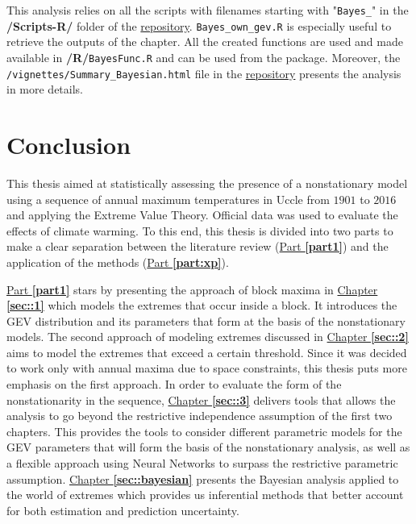 \documentclass[11pt,a4paper,openany, twosided]{book}
\begin{document}
This analysis relies on all the scripts with filenames starting with "\texttt{Bayes\_}" in the \textbf{/Scripts-R/} folder of the \href{https://github.com/proto4426/PissoortThesis/}{repository}. \texttt{Bayes\_own\_gev.R} is especially useful to retrieve the outputs of the chapter.  All the created functions are used and made available in \textbf{/R/}\texttt{BayesFunc.R} and can be used from the package. Moreover,
the \texttt{/vignettes/Summary\_Bayesian.html} file in the \href{https://github.com/proto4426/PissoortThesis/}{repository} presents the analysis in more details.

\newpage





\chapter*{Conclusion}
\thispagestyle{empty}

This thesis aimed at statistically assessing the presence of a nonstationary model using a sequence of annual maximum temperatures in Uccle from $1901$ to $2016$  and applying the Extreme Value Theory. Official data was used to evaluate the effects of climate warming.
To this end, this thesis is divided into two parts to make a clear separation between the literature review (\hyperref[part1]{Part \textbf{\ref{part1}}}) and the application of the methods (\hyperref[part:xp]{Part \textbf{\ref{part:xp}}}).

\hyperref[part1]{Part \textbf{\ref{part1}}} stars by presenting the approach of block maxima in \hyperref[sec::1]{Chapter \textbf{\ref{sec::1}}} which models the extremes that occur inside a block. It introduces the GEV distribution and its parameters that form at the basis of the nonstationary models.
The second approach of modeling extremes discussed in \hyperref[sec::2]{Chapter \textbf{\ref{sec::2}}} aims to model the extremes that exceed a certain threshold.
Since it was decided to work only with annual maxima due to space constraints, this thesis puts more emphasis on the first approach. In order to evaluate the form of the nonstationarity in the sequence,
\hyperref[sec::3]{Chapter \textbf{\ref{sec::3}}} delivers tools that allows the analysis to go beyond the restrictive independence assumption of the first two chapters. This provides the tools to consider different parametric models for the GEV parameters that will form the basis of the nonstationary analysis, as well as a flexible approach using Neural Networks to surpass  the restrictive parametric assumption.
\hyperref[sec::bayesian]{Chapter \textbf{\ref{sec::bayesian}}} presents the Bayesian analysis applied to the world of extremes which provides us inferential methods that better account for both  estimation and prediction uncertainty. 
\end{document}
